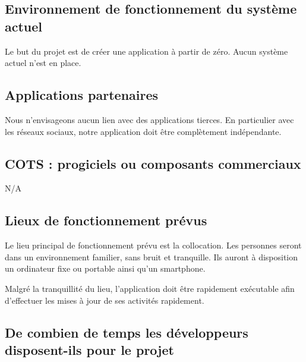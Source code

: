 
\subsection{Environnement de fonctionnement du système actuel} %
\label{sub:environnement_de_fonctionnement_du_syst_me_actuel}

	Le but du projet est de créer une application à partir de zéro. Aucun système actuel n'est en place.


\subsection{Applications partenaires} %
\label{sub:applications_partenaires}

	Nous n'envisageons aucun lien avec des applications tierces. En particulier avec les réseaux sociaux, notre application doit être complètement indépendante.


\subsection{COTS : progiciels ou composants commerciaux} %
\label{sub:cots_progiciels_ou_composants_commerciaux}

	N/A


\subsection{Lieux de fonctionnement prévus} %
\label{sub:lieux_de_fonctionnement_pr_vus}

	Le lieu principal de fonctionnement prévu est la collocation. Les personnes seront dans un environnement familier, sans bruit et tranquille. Ils auront à disposition un ordinateur fixe ou portable ainsi qu'un smartphone.

	Malgré la tranquillité du lieu, l'application doit être rapidement exécutable afin d'effectuer les mises à jour de ses activités rapidement.


\subsection{De combien de temps les développeurs disposent-ils pour le projet} %
\label{sub:de_combien_de_temps_les_d_veloppeurs_disposent_ils_pour_le_projet}

